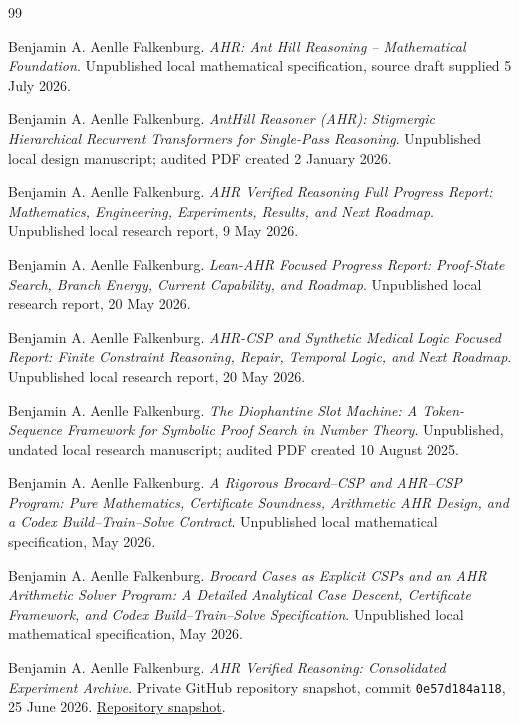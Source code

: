 \documentclass[11pt,oneside]{book}
\theoremstyle{remark}
\begin{document}
\begin{thebibliography}{99}

Benjamin A. Aenlle Falkenburg.
\newblock \emph{AHR: Ant Hill Reasoning -- Mathematical Foundation}.
\newblock Unpublished local mathematical specification, source draft supplied
5 July 2026.

Benjamin A. Aenlle Falkenburg.
\newblock \emph{AntHill Reasoner (AHR): Stigmergic Hierarchical Recurrent
Transformers for Single-Pass Reasoning}.
\newblock Unpublished local design manuscript; audited PDF created
2 January 2026.

Benjamin A. Aenlle Falkenburg.
\newblock \emph{AHR Verified Reasoning Full Progress Report: Mathematics, Engineering, Experiments, Results, and Next Roadmap}.
\newblock Unpublished local research report, 9 May 2026.

Benjamin A. Aenlle Falkenburg.
\newblock \emph{Lean-AHR Focused Progress Report: Proof-State Search, Branch Energy, Current Capability, and Roadmap}.
\newblock Unpublished local research report, 20 May 2026.

Benjamin A. Aenlle Falkenburg.
\newblock \emph{AHR-CSP and Synthetic Medical Logic Focused Report: Finite Constraint Reasoning, Repair, Temporal Logic, and Next Roadmap}.
\newblock Unpublished local research report, 20 May 2026.

Benjamin A. Aenlle Falkenburg.
\newblock \emph{The Diophantine Slot Machine: A Token-Sequence Framework for Symbolic Proof Search in Number Theory}.
\newblock Unpublished, undated local research manuscript; audited PDF created
10 August 2025.

Benjamin A. Aenlle Falkenburg.
\newblock \emph{A Rigorous Brocard--CSP and AHR--CSP Program: Pure
Mathematics, Certificate Soundness, Arithmetic AHR Design, and a Codex
Build--Train--Solve Contract}.
\newblock Unpublished local mathematical specification, May 2026.

Benjamin A. Aenlle Falkenburg.
\newblock \emph{Brocard Cases as Explicit CSPs and an AHR Arithmetic Solver
Program: A Detailed Analytical Case Descent, Certificate Framework, and Codex
Build--Train--Solve Specification}.
\newblock Unpublished local mathematical specification, May 2026.

Benjamin A. Aenlle Falkenburg.
\newblock \emph{AHR Verified Reasoning: Consolidated Experiment Archive}.
\newblock Private GitHub repository snapshot,
commit \texttt{0e57d184a118},
25 June 2026.
\newblock
\href{https://github.com/BoredDuffa/ahr-verified-reasoning-20260509/tree/0e57d184a1189fd0abf084345bc4ecbad262f30a}
{Repository snapshot}.


\end{thebibliography}
\end{document}
